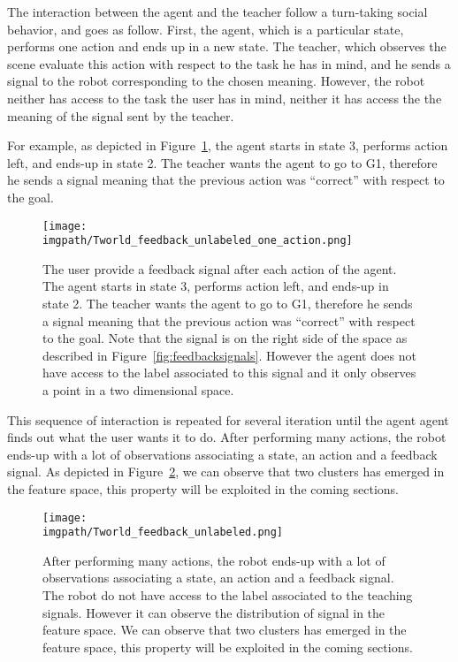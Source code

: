 The interaction between the agent and the teacher follow a turn-taking social behavior, and goes as follow. First, the agent, which is a particular state, performs one action and ends up in a new state. The teacher, which observes the scene evaluate this action with respect to the task he has in mind, and he sends a signal to the robot corresponding to the chosen meaning. However, the robot neither has access to the task the user has in mind, neither it has access the the meaning of the signal sent by the teacher.

For example, as depicted in Figure~\ref{fig:TworldOneStepUnlabeled}, the agent starts in state 3, performs action left, and ends-up in state 2. The teacher wants the agent to go to G1, therefore he sends a signal meaning that the previous action was ``correct'' with respect to the goal.

\begin{figure}[!ht]
  \centering
  \texttt{[image: \\imgpath/Tworld\_feedback\_unlabeled\_one\_action.png]}
  \caption{The user provide a feedback signal after each action of the agent. The agent starts in state 3, performs action left, and ends-up in state 2. The teacher wants the agent to go to G1, therefore he sends a signal meaning that the previous action was ``correct'' with respect to the goal. Note that the signal is on the right side of the space as described in Figure~\ref{fig:feedbacksignals}. However the agent does not have access to the label associated to this signal and it only observes a point in a two dimensional space.}
  \label{fig:TworldOneStepUnlabeled}
\end{figure}

This sequence of interaction is repeated for several iteration until the agent agent finds out what the user wants it to do. After performing many actions, the robot ends-up with a lot of observations associating a state, an action and a feedback signal. As depicted in Figure~\ref{fig:TworldManyStepUnlabeled}, we can observe that two clusters has emerged in the feature space, this property will be exploited in the coming sections.

\begin{figure}[!ht]
  \centering
  \texttt{[image: \\imgpath/Tworld\_feedback\_unlabeled.png]}
  \caption{After performing many actions, the robot ends-up with a lot of observations associating a state, an action and a feedback signal. The robot do not have access to the label associated to the teaching signals. However it can observe the distribution of signal in the feature space. We can observe that two clusters has emerged in the feature space, this property will be exploited in the coming sections.}
  \label{fig:TworldManyStepUnlabeled}
\end{figure}


